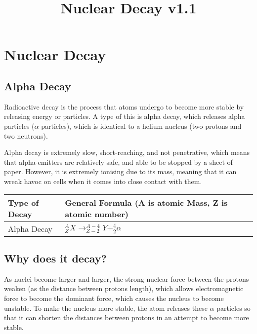 \documentclass[
]{article}
\title{Nuclear Decay v1.1}
\author{}
\date{}
\begin{document}
\maketitle

\hypertarget{nuclear-decay}{%
\section{Nuclear Decay}\label{nuclear-decay}}

\hypertarget{alpha-decay}{%
\subsection{Alpha Decay}\label{alpha-decay}}

Radioactive decay is the process that atoms undergo to become more
stable by releasing energy or particles. A type of this is alpha decay,
which releases alpha particles ({\(\alpha\)} particles), which is
identical to a helium nucleus (two protons and two neutrons).

Alpha decay is extremely slow, short-reaching, and not penetrative,
which means that alpha-emitters are relatively safe, and able to be
stopped by a sheet of paper. However, it is extremely ionising due to
its mass, meaning that it can wreak havoc on cells when it comes into
close contact with them.

\begin{longtable}[]{@{}ll@{}}
\toprule()
Type of Decay & General Formula (A is atomic Mass, Z is atomic
number) \\
\midrule()
\endhead
Alpha Decay &
{\(_{Z}^{A}X \rightarrow_{Z - 2}^{A - 4}Y +_{2}^{4}\alpha\)} \\
\bottomrule()
\end{longtable}

\hypertarget{why-does-it-decay}{%
\subsection{Why does it decay?}\label{why-does-it-decay}}

As nuclei become larger and larger, the strong nuclear force between the
protons weaken (as the distance between protons length), which allows
electromagnetic force to become the dominant force, which causes the
nucleus to become unstable. To make the nucleus more stable, the atom
releases these {\(\alpha\)} particles so that it can shorten the
distances between protons in an attempt to become more stable.
\end{document}
